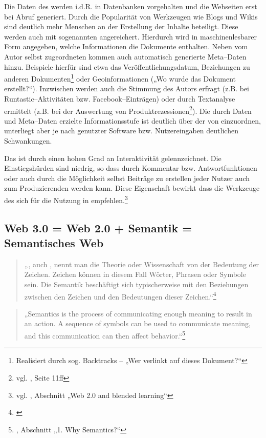 Die Daten des  werden i.d.R. in Datenbanken vorgehalten und die Webseiten erst bei Abruf generiert. Durch die Popularität von Werkzeugen wie Blogs und Wikis sind deutlich mehr Menschen an der Erstellung der Inhalte beteiligt. Diese werden auch mit sogenannten  angereichert. Hierdurch wird in maschinenlesbarer Form angegeben, welche Informationen die Dokumente enthalten. Neben vom Autor selbst zugeordneten  kommen auch automatisch generierte Meta--Daten hinzu. Beispiele hierfür sind etwa das Veröffentlichungsdatum, Beziehungen zu anderen Dokumenten\footnote{Realisiert durch sog. Backtracks -- „Wer verlinkt auf dieses Dokument?“} oder Geoinformationen („Wo wurde das Dokument erstellt?“). Inzwischen werden auch die Stimmung des Autors erfragt (z.B. bei Runtastic–Aktivitäten bzw. Facebook--Einträgen) oder durch Textanalyse ermittelt (z.B. bei der Auswertung von Produktrezessionen\footnote{vgl. \cite{sprejz}, Seite 11ff}). Die durch Daten und Meta--Daten erzielte Informationsstufe ist deutlich über der von  einzuordnen, unterliegt aber je nach genutzter Software bzw. Nutzereingaben deutlichen Schwankungen.

Das  ist durch einen hohen Grad an Interaktivität gelennzeichnet. Die Einstiegshürden sind niedrig, so dass durch Kommentar bzw. Antwortfunktionen oder auch durch die Möglichkeit selbst Beiträge zu erstellen jeder Nutzer auch zum Produzierenden werden kann. Diese Eigenschaft bewirkt dass die Werkzeuge des  sich für die Nutzung in  empfehlen.\footnote{vgl. \cite{livingston}, Abschnitt „Web 2.0 and blended learning“}

\subsection{Web 3.0 = Web 2.0 + Semantik = Semantisches Web}

\begin{quote}„, auch , nennt man die Theorie oder Wissenschaft von der Bedeutung der Zeichen. Zeichen können in diesem Fall Wörter, Phrasen oder Symbole sein. Die Semantik beschäftigt sich typischerweise mit den Beziehungen zwischen den Zeichen und den Bedeutungen dieser Zeichen.“\footnote{\cite{wp:semantik}}\end{quote}

\begin{quote}„Semantics is the process of communicating enough meaning to result in an action. A sequence of symbols can be used to communicate meaning, and this communication can then affect behavior.“\footnote{\cite{sagaran}, Abschnitt „1. Why Semantics?“}\end{quote}

